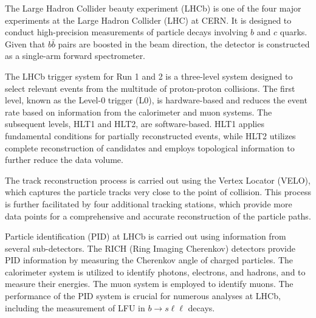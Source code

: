 The Large Hadron Collider beauty experiment (LHCb) is one of the four major experiments 
at the Large Hadron Collider (LHC) at CERN. It is designed to conduct high-precision 
measurements of particle decays involving $b$ and $c$ quarks. Given that $b\bar{b}$ pairs 
are boosted in the beam direction, the detector is constructed as a single-arm forward 
spectrometer. \cite{LHCb}

The LHCb trigger system for Run 1 and 2 is a three-level system designed to select relevant events from 
the multitude of proton-proton collisions. The first level, known as the Level-0 trigger 
(L0), is hardware-based and reduces the event rate based on information from the calorimeter 
and muon systems. The subsequent levels, HLT1 and HLT2, are software-based. HLT1 applies 
fundamental conditions for partially reconstructed events, while HLT2 utilizes complete 
reconstruction of candidates and employs topological information to further reduce the 
data volume. \cite{trigger}

The track reconstruction process is carried out using the Vertex Locator (VELO), which 
captures the particle tracks very close to the point of collision. This process is further 
facilitated by four additional tracking stations, which provide more data points for a 
comprehensive and accurate reconstruction of the particle paths.

Particle identification (PID) at LHCb is carried out using information from several 
sub-detectors. The RICH (Ring Imaging Cherenkov) detectors provide PID information by 
measuring the Cherenkov angle of charged particles. The calorimeter system is utilized 
to identify photons, electrons, and hadrons, and to measure their energies. The muon 
system is employed to identify muons. The performance of the PID system is crucial for 
numerous analyses at LHCb, including the measurement of LFU in $b\to s\ell\ell$ 
decays. \cite{LHCb}

